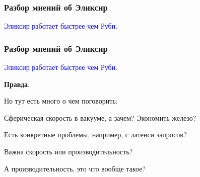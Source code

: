 \documentclass[10pt]{beamer}
\begin{document}

\begin{frame}
\frametitle{Разбор мнений об Эликсир}
\centering
\textcolor{blue}{Эликсир работает быстрее чем Руби.}
\end{frame}

\begin{frame}
\frametitle{Разбор мнений об Эликсир}
\centering
\textcolor{blue}{Эликсир работает быстрее чем Руби.}
\par \bigskip
\textbf{Правда}.
\par \bigskip
Но тут есть много о чем поговорить:
\par \bigskip
Сферическая скорость в вакууме, а зачем? Экономить железо?
\par
Есть конкретные проблемы, например, с латенси запросов?
\par
Важна скорость или производительность?
\par
А производительность, это что вообще такое?
\end{frame}





\end{document}
